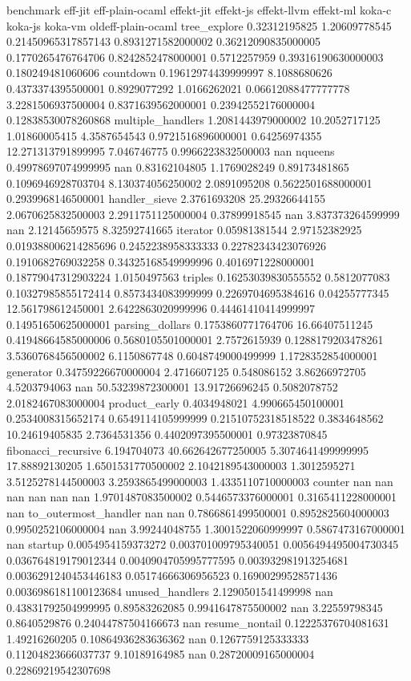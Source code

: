 benchmark	eff-jit	eff-plain-ocaml	effekt-jit	effekt-js	effekt-llvm	effekt-ml	koka-c	koka-js	koka-vm	oldeff-plain-ocaml
tree_explore	0.32312195825	1.20609778545	0.21450965317857143	0.8931271582000002	0.36212090835000005	0.1770265476764706	0.8242852478000001	0.5712257959	0.39316190630000003	0.180249481060606
countdown	0.19612974439999997	8.1088680626	0.4373374395500001	0.8929077292	1.0166262021	0.06612088477777778	3.2281506937500004	0.8371639562000001	0.23942552176000004	0.12838530078260868
multiple_handlers	1.2081443979000002	10.2052717125	1.01860005415	4.3587654543	0.9721516896000001	0.64256974355	12.271313791899995	7.046746775	0.9966223832500003	nan
nqueens	0.49978697074999995	nan	0.83162104805	1.1769028249	0.89173481865	0.1096946928703704	8.130374056250002	2.0891095208	0.5622501688000001	0.2939968146500001
handler_sieve	2.3761693208	25.29326644155	2.0670625832500003	2.2911751125000004	0.37899918545	nan	3.837373264599999	nan	2.12145659575	8.32592741665
iterator	0.05981381544	2.97152382925	0.019388006214285696	0.2452238958333333	0.22782343423076926	0.1910682769032258	0.34325168549999996	0.4016971228000001	0.18779047312903224	1.0150497563
triples	0.16253039830555552	0.5812077083	0.10327985855172414	0.8573434083999999	0.2269704695384616	0.04255777345	12.561798612450001	2.6422863020999996	0.44461410414999997	0.14951650625000001
parsing_dollars	0.1753860771764706	16.66407511245	0.41948664585000006	0.5680105501000001	2.7572615939	0.1288179203478261	3.5360768456500002	6.1150867748	0.6048749000499999	1.1728352854000001
generator	0.34759226670000004	2.4716607125	0.548086152	3.86266972705	4.5203794063	nan	50.53239872300001	13.91726696245	0.5082078752	2.0182467083000004
product_early	0.4034948021	4.990665450100001	0.2534008315652174	0.6549114105999999	0.21510752318518522	0.3834648562	10.24619405835	2.7364531356	0.4402097395500001	0.97323870845
fibonacci_recursive	6.194704073	40.662642677250005	5.3074641499999995	17.88892130205	1.6501531770500002	2.1042189543000003	1.3012595271	3.5125278144500003	3.2593865499000003	1.4335110710000003
counter	nan	nan	nan	nan	nan	nan	1.9701487083500002	0.5446573376000001	0.3165411228000001	nan
to_outermost_handler	nan	nan	0.7866861499500001	0.8952825604000003	0.9950252106000004	nan	3.99244048755	1.3001522060999997	0.5867473167000001	nan
startup	0.0054954159373272	0.003701009795340051	0.0056494495004730345	0.036764819179012344	0.0040904705995777595	0.003932981913254681	0.0036291240453446183	0.05174666306956523	0.16900299528571436	0.0036986181100123684
unused_handlers	2.1290501541499998	nan	0.43831792504999995	0.89583262085	0.9941647875500002	nan	3.22559798345	0.8640529876	0.24044787504166673	nan
resume_nontail	0.12225376704081631	1.49216260205	0.10864936283636362	nan	0.1267759125333333	0.11204823666037737	9.10189164985	nan	0.28720009165000004	0.22869219542307698